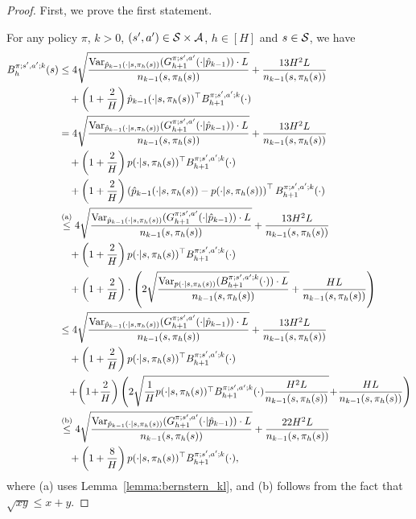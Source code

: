 \begin{proof}
	First, we prove the first statement.
	
	For any policy $\pi$, $k>0$, $(s',a') \in \mathcal{S} \times \mathcal{A}$, $h \in [H]$ and $s \in \mathcal{S}$, we have
	\begin{align}
		B^{\pi;s',a';k}_h(s) &\leq 4\sqrt{\frac{ \textup{Var}_{\hat{p}_{k-1}(\cdot|s,\pi_h(s))}(G^{\pi;s',a'}_{h+1}(\cdot|\hat{p}_{k-1})) \cdot L}{{n_{k-1}(s,\pi_h(s))}}}  + \frac{13H^2L}{n_{k-1}(s,\pi_h(s))}
		\nonumber\\& \quad + \left( 1+\frac{2}{H} \right) \hat{p}_{k-1}(\cdot|s,\pi_h(s))^\top B^{\pi;s',a';k}_{h+1}(\cdot)
		\nonumber\\
		&= 4\sqrt{\frac{ \textup{Var}_{\hat{p}_{k-1}(\cdot|s,\pi_h(s))}(G^{\pi;s',a'}_{h+1}(\cdot|\hat{p}_{k-1})) \cdot L}{{n_{k-1}(s,\pi_h(s))}}}  + \frac{13H^2L}{n_{k-1}(s,\pi_h(s))} 
		\nonumber\\& \quad + \left( 1+\frac{2}{H} \right) p(\cdot|s,\pi_h(s))^\top B^{\pi;s',a';k}_{h+1}(\cdot) \nonumber\\
		&\quad + \left( 1+\frac{2}{H} \right) \left( \hat{p}_{k-1}(\cdot|s,\pi_h(s)) - p(\cdot|s,\pi_h(s)) \right)^\top B^{\pi;s',a';k}_{h+1}(\cdot)
		\nonumber\\
		&\overset{\textup{(a)}}{\leq} 4\sqrt{\frac{ \textup{Var}_{\hat{p}_{k-1}(\cdot|s,\pi_h(s))}(G^{\pi;s',a'}_{h+1}(\cdot|\hat{p}_{k-1})) \cdot L}{{n_{k-1}(s,\pi_h(s))}}}  + \frac{13H^2L}{n_{k-1}(s,\pi_h(s))} 
		\nonumber\\
		&\quad + \left( 1+\frac{2}{H} \right) p(\cdot|s,\pi_h(s))^\top B^{\pi;s',a';k}_{h+1}(\cdot) 
		\nonumber\\& \quad +  \left( 1+\frac{2}{H} \right) \cdot \left(  2 \sqrt{ \frac{\textup{Var}_{p(\cdot|s,\pi_h(s))}(B^{\pi;s',a';k}_{h+1}(\cdot)) \cdot L}{n_{k-1}(s,\pi_h(s))}} + \frac{HL}{n_{k-1}(s,\pi_h(s))}  \right)
		\nonumber\\
		&\leq 4\sqrt{\frac{ \textup{Var}_{\hat{p}_{k-1}(\cdot|s,\pi_h(s))}(G^{\pi;s',a'}_{h+1}(\cdot|\hat{p}_{k-1})) \cdot L}{{n_{k-1}(s,\pi_h(s))}}}  + \frac{13H^2L}{n_{k-1}(s,\pi_h(s))} 
		\nonumber\\
		&\quad + \left( 1+\frac{2}{H} \right) p(\cdot|s,\pi_h(s))^\top B^{\pi;s',a';k}_{h+1}(\cdot) 
		\nonumber\\& \quad \!+\! \left( 1 \!+\! \frac{2}{H} \right)  \left(  2\sqrt{ \frac{1}{H} p(\cdot|s,\pi_h(s))^\top B^{\pi;s',a';k}_{h+1}(\cdot) \frac{H^2L}{n_{k-1}(s,\pi_h(s)) }} \!+\! \frac{HL}{n_{k-1}(s,\pi_h(s)) }  \right)
		\nonumber\\
		&\overset{\textup{(b)}}{\leq} 4\sqrt{\frac{ \textup{Var}_{\hat{p}_{k-1}(\cdot|s,\pi_h(s))}(G^{\pi;s',a'}_{h+1}(\cdot|\hat{p}_{k-1})) \cdot L}{{n_{k-1}(s,\pi_h(s))}}}  + \frac{22H^2L}{n_{k-1}(s,\pi_h(s))} 
		\nonumber\\
		&\quad + \left( 1+\frac{8}{H} \right) p(\cdot|s,\pi_h(s))^\top B^{\pi;s',a';k}_{h+1}(\cdot) , \label{eq:unfold_B_k}
	\end{align}
	where (a) uses Lemma~\ref{lemma:bernstern_kl}, and (b) follows from the fact that $\sqrt{xy} \leq x + y$.
	

\end{proof}
